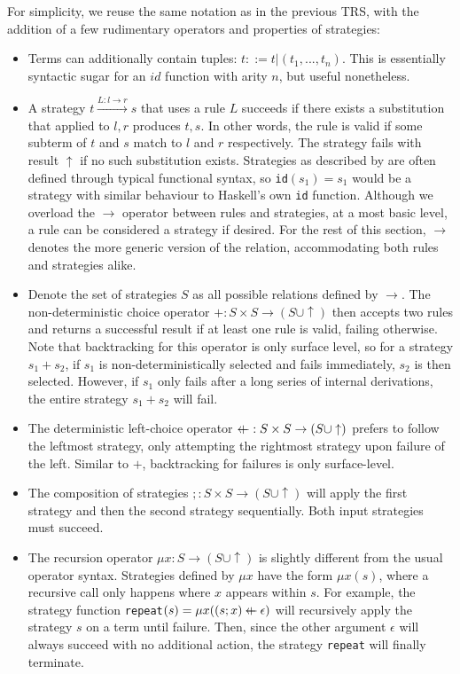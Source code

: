 \documentclass{article}
\makeatletter
\newcommand{\superimpose}[2]{{%
  \ooalign{%
    \hfil$\m@th#1\@firstoftwo#2$\hfil\cr
    \hfil$\m@th#1\@secondoftwo#2$\hfil\cr
  }%
}}
\newcommand{\leftplus}{\mathbin{\mathpalette\superimpose{{\leftarrow}{+}}}}
\makeatother
\begin{document}
For simplicity, we reuse the same notation as in the previous TRS, with the addition of a few rudimentary operators and properties of strategies:
\begin{itemize}
    \item Terms can additionally contain tuples: $t ::= t | (t_1, ..., t_n)$. This is essentially syntactic sugar for an $id$ function with arity $n$,
    but useful nonetheless.
    \item A strategy $t \xrightarrow{L: l\rightarrow r} s$ that uses a rule $L$ succeeds if there exists a substitution that applied to $l, r$ produces $t, s$.
    In other words, the rule is valid if some subterm of $t$ and $s$ match to $l$ and $r$ respectively.
    The strategy fails with result $\uparrow$ if no such substitution exists.
    Strategies as described by \cite{elco1998building} are often defined through typical functional syntax,
    so \texttt{id}$(s_1) = s_1$ would be a strategy with similar behaviour to Haskell's own \texttt{id} function.
    Although we overload the $\rightarrow$ operator between rules and strategies, at a most basic level, a rule can be considered a strategy if desired.
    For the rest of this section, $\rightarrow$ denotes the more generic version of the relation, accommodating both rules and strategies alike.
    \item Denote the set of strategies $S$ as all possible relations defined by $\rightarrow$. The non-deterministic choice operator $+: S \times S\rightarrow (S\cup \uparrow)$
    then accepts two rules and returns a successful result if at least one rule is valid, failing otherwise. Note that backtracking for this operator is only surface level,
    so for a strategy $s_1 + s_2$, if $s_1$ is non-deterministically selected and fails immediately, $s_2$ is then selected. However,
    if $s_1$ only fails after a long series of internal derivations, the entire strategy $s_1 + s_2$ will fail.
    \item The deterministic left-choice operator $\leftplus: S \times S \rightarrow (S\cup \uparrow)$ prefers to follow the leftmost strategy, only attempting the rightmost strategy
    upon failure of the left. Similar to $+$, backtracking for failures is only surface-level.
    \item The composition of strategies $;: S \times S \rightarrow (S\cup \uparrow)$ will apply the first strategy and then the second strategy sequentially. Both
    input strategies must succeed.
    \item The recursion operator $\mu x: S \rightarrow (S\cup \uparrow)$ is slightly different from the usual operator syntax. Strategies defined by $\mu x$ have the form
    $\mu x (s)$, where a recursive call only happens where $x$ appears within $s$. For example, the strategy function \texttt{repeat}$(s) = \mu x ((s;x)\leftplus \epsilon)$
    will recursively apply the strategy $s$ on a term until failure. Then, since the other argument $\epsilon$ will always succeed with
    no additional action, the strategy \texttt{repeat} will finally terminate.
\end{itemize}
\end{document}
